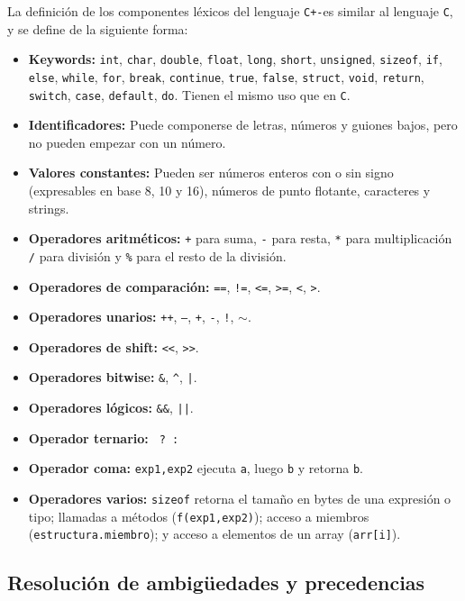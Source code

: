 \documentclass[12pt]{article}
\newcommand{\Cp}{\texttt{C+-}}
\newcommand{\C}{\texttt{C}}
\begin{document}
La definici\'on de los componentes l\'exicos del lenguaje \Cp es similar al lenguaje \C, y se define de la siguiente forma:
\begin{itemize}
    \item \textbf{Keywords:} \texttt{int}, \texttt{char}, \texttt{double}, \texttt{float}, \texttt{long}, \texttt{short}, \texttt{unsigned}, \texttt{sizeof}, \texttt{if}, \texttt{else}, \texttt{while}, \texttt{for}, \texttt{break}, \texttt{continue}, \texttt{true}, \texttt{false}, \texttt{struct}, \texttt{void}, \texttt{return}, \texttt{switch}, \texttt{case}, \texttt{default}, \texttt{do}. Tienen el mismo uso que en \C.
    \item \textbf{Identificadores:} Puede componerse de letras, n\'umeros y guiones bajos, pero no pueden empezar con un n\'umero.
    \item \textbf{Valores constantes:} Pueden ser n\'umeros enteros con o sin signo (expresables en base 8, 10 y 16), n\'umeros de punto flotante, caracteres y strings.
    \item \textbf{Operadores aritm\'eticos:} \texttt{+} para suma, \texttt{-} para resta, \texttt{*} para multiplicaci\'on \texttt{/} para divisi\'on y \texttt{\%} para el resto de la divisi\'on.
    \item \textbf{Operadores de comparaci\'on:} \texttt{==}, \texttt{!=}, \texttt{<=}, \texttt{>=}, \texttt{<}, \texttt{>}.
    \item \textbf{Operadores unarios:} \texttt{++}, \texttt{--}, \texttt{+}, \texttt{-}, \texttt{!}, $\mathtt\sim$.
    \item \textbf{Operadores de shift:} \texttt{<<}, \texttt{>>}.
    \item \textbf{Operadores bitwise:} \texttt{\&}, \texttt{\^}, \texttt{|}.
    \item \textbf{Operadores l\'ogicos:} \texttt{\&\&}, \texttt{||}.
    \item \textbf{Operador ternario:} \texttt{ ? : }
    \item \textbf{Operador coma:} \texttt{exp1,exp2} ejecuta \texttt{a}, luego \texttt{b} y retorna \texttt{b}.
    \item \textbf{Operadores varios:} \texttt{sizeof} retorna el tama\~no en bytes de una expresi\'on o tipo; llamadas a m\'etodos (\texttt{f(exp1,exp2)}); acceso a miembros (\texttt{estructura.miembro}); y acceso a elementos de un array (\texttt{arr[i]}).
\end{itemize}

\subsection*{Resoluci\'on de ambig\"uedades y precedencias}
\end{document}
